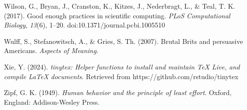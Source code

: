 \documentclass[
  letterpaper,
  krantz1]{latex/krantz-mod}
\newlength{\cslhangindent}
\newenvironment{CSLReferences}[2] %
 {\begin{list}{}{%
  \setlength{\itemindent}{0pt}
  \setlength{\leftmargin}{0pt}
  \setlength{\parsep}{0pt}
  \ifodd #1
   \setlength{\leftmargin}{\cslhangindent}
   \setlength{\itemindent}{-1\cslhangindent}
  \fi
  \setlength{\itemsep}{#2\baselineskip}}}
 {\end{list}}
\theoremstyle{definition}
\theoremstyle{definition}
\theoremstyle{remark}
\begin{document}
\begin{CSLReferences}{1}{0}
Wilson, G., Bryan, J., Cranston, K., Kitzes, J., Nederbragt, L., \&
Teal, T. K. (2017). Good enough practices in scientific computing.
\emph{PLoS Computational Biology}, \emph{13}(6), 1--20.
doi:10.1371/journal.pcbi.1005510

Wulff, S., Stefanowitsch, A., \& Gries, S. Th. (2007). Brutal {Brits}
and persuasive {Americans}. \emph{Aspects of Meaning}.

Xie, Y. (2024). \emph{{tinytex}: Helper functions to install and
maintain {T}eX {L}ive, and compile {LaTeX} documents}. Retrieved from
https://github.com/rstudio/tinytex

Zipf, G. K. (1949). \emph{Human behavior and the principle of least
effort}. Oxford, England: Addison-Wesley Press.

\end{CSLReferences}



\printindex
\end{document}
